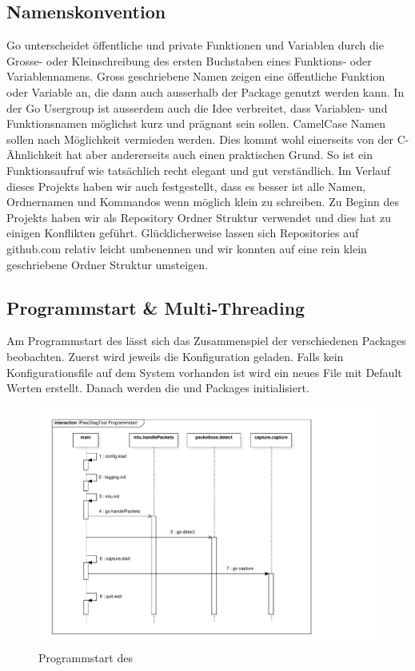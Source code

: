 \subsection{Namenskonvention}
Go unterscheidet öffentliche und private Funktionen und Variablen durch die Grosse- oder Kleinschreibung des ersten Buchstaben eines Funktions- oder Variablennamens. Gross geschriebene Namen zeigen eine öffentliche Funktion oder Variable an, die dann auch ausserhalb der Package genutzt werden kann.
In der Go Usergroup ist ausserdem auch die Idee verbreitet, dass Variablen- und Funktionsnamen möglichst kurz und prägnant sein sollen. CamelCase Namen sollen nach Möglichkeit vermieden werden. Dies kommt wohl einerseits von der C-Ähnlichkeit hat aber andererseits auch einen praktischen Grund. So ist ein Funktionsaufruf wie  tatsächlich recht elegant und gut verständlich.
Im Verlauf dieses Projekts haben wir auch festgestellt, dass es besser ist alle Namen, Ordnernamen und Kommandos wenn möglich klein zu schreiben. Zu Beginn des Projekts haben wir  als Repository Ordner Struktur verwendet und dies hat zu einigen Konflikten geführt. Glücklicherweise lassen sich Repositories auf github.com relativ leicht umbenennen und wir konnten auf eine rein klein geschriebene Ordner Struktur umsteigen.

\subsection{Programmstart \& Multi-Threading}
Am Programmstart des \tool{} lässt sich das Zusammenspiel der verschiedenen Packages beobachten. Zuerst wird jeweils die Konfiguration geladen. Falls kein Konfigurationsfile auf dem System vorhanden ist wird ein neues File mit Default Werten erstellt. Danach werden die  und  Packages initialisiert.

\begin{figure}[ht]
    \begin{center}
        \includegraphics[trim=30 20 150 30,clip,width=\textwidth]{mainpart/implementation/img/programmstart}
    \end{center}
    \caption{Programmstart des \tool{}}
\end{figure}

